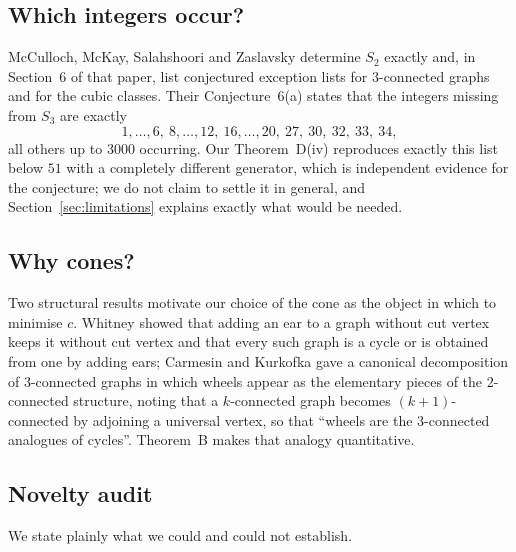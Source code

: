 \documentclass[11pt,a4paper]{article}
\theoremstyle{definition}
\begin{document}
\subsection{Which integers occur?}

McCulloch, McKay, Salahshoori and Zaslavsky \cite{mcculloch2026} determine
$S_2$ exactly and, in Section~6 of that paper, list conjectured exception lists
for $3$-connected graphs and for the cubic classes.  Their Conjecture~6(a)
states that the integers missing from $S_3$ are exactly
\[
  1,\dots,6,\ 8,\dots,12,\ 16,\dots,20,\ 27,\ 30,\ 32,\ 33,\ 34 ,
\]
all others up to $3000$ occurring.  Our Theorem~D(iv) reproduces exactly this
list below $51$ with a completely different generator, which is independent
evidence for the conjecture; we do not claim to settle it in general, and
Section~\ref{sec:limitations} explains exactly what would be needed.

\subsection{Why cones?}

Two structural results motivate our choice of the cone as the object in which
to minimise $c$.  Whitney \cite{whitney1932} showed that adding an ear to a
graph without cut vertex keeps it without cut vertex and that every such graph
is a cycle or is obtained from one by adding ears; Carmesin and Kurkofka
\cite{carmesin2025} gave a canonical decomposition of $3$-connected graphs in
which wheels appear as the elementary pieces of the $2$-connected structure,
noting that a $k$-connected graph becomes $(k+1)$-connected by adjoining a
universal vertex, so that ``wheels are the $3$-connected analogues of
cycles''.  Theorem~B makes that analogy quantitative.

\subsection{Novelty audit}\label{sec:novelty}

We state plainly what we could and could not establish.
\end{document}

